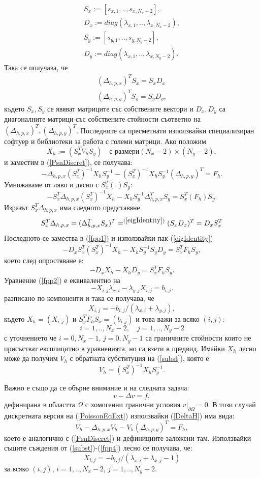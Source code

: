 \documentclass{article}
\newcommand{\be}{\begin{equation}}
\newcommand{\ee}{\end{equation}}
\newcommand{\rf}[1]{(\ref{#1})}
\theoremstyle{remark}
\begin{document}
\begin{align}
S_x:=[s_{x,1},..,s_{x,N_x-2}],\\
D_x:= diag(\lambda_{x,1},..,\lambda_{x,N_x-2}),\\
S_y:=[s_{y,1},..,s_{y,N_y-2}],\\
D_y:= diag(\lambda_{x,1},..,\lambda_{x,N_y-2}).
\end{align}
Така се получава, че
\begin{align}\label{eigIdentity}
(\Delta_{h,p,x})^T  S_x = S_x  D_x\nonumber\\
(\Delta_{h,p,y})^T   S_y = S_y  D_y,
\end{align}
където $S_x, S_y$ се явяват матриците със собствените вектори и $D_x, D_y$ са диагоналните матрици със собствените стойности съответно на $(\Delta_{h,p,x})^T, (\Delta_{h,p,y})^T$. Последните са пресметнати използвайки специализиран софтуер и библиотеки за работа с големи матрици. Ако положим
\be\label{subst}
X_h := ( S_x^T  V_h  S_y ) \quad \text{с размери} (N_x-2)\times(N_y-2),
\ee
и заместим в \rf{PsnDiscret}, се получава:
\be
-\Delta_{h,p,x}  (S_x^T)^{-1} X_h  S_y^{-1}  -(S_x^T)^{-1} X_h  S_y^{-1}  (\Delta_{h,p,y})^T = F_h.
\ee
Умножаваме от ляво и дясно с $ S_x^T  ( . )  S_y$:
\be\label{fpp1}
- S_x^T \Delta_{h,p,x} (S_x^T)^{-1} X_h -X_h  S_y^{-1}  \Delta_{h,p,x}^T  S_y = S_x^T  ( F_h )  S_y.
\ee
Изразът $S_x^T  \Delta_{h,p,x}$ има следното представяне
\be
S_x^T  \Delta_{h,p,x} = (\Delta_{h,p,x}^T  S_x)^T =^{\rf{eigIdentity}} (S_x  D_x)^T = D_x  S_x^T
\ee
Последното се замества в \rf{fpp1} и използвайки пак \rf{eigIdentity}
\be
- D_x  S_x^T (S_x^T)^{-1} X_h  -X_h  S_y^{-1}  S_y  D_y = S_x^T  F_h   S_y,
\ee
което след опростяване е:
\be\label{fpp2}
- D_x  X_h -X_h  D_y = S_x^T  F_h  S_y.
\ee
Уравнение \rf{fpp2} е еквивалентно на
\be\label{fpp3}
-X_{i,j} \lambda_{x,i} - \lambda_{y,j} X_{i,j} = b_{i,j}.
\ee
разписано по компоненти и така се получава, че
\be\label{fpp4}
X_{i,j} = - b_{i,j}/(\lambda_{x,i} + \lambda_{y,j} ),
\ee
където $X_h = (X_{i,j})$ и $S_y^T  F_h   S_x = (b_{i,j})$ и това важи за всяко $(i,j)$:
$$i = 1,..,N_x-2, \quad j = 1,..,N_y-2 $$
с уточнението че $i = 0,N_x-1$, $j = 0,N_y-1$ са граничните стойности които не присъстват експлицитно в уравненията, но са взети в предвид. Имайки $X_h$ лесно може да получим $V_h$  с обратната субституция на \rf{subst}, която е 
\be\label{substInv}
V_h = (S_x^T)^{-1}  X_h  S_y^{-1}.
\ee

Важно е също да се обърне внимание и на следната задача:
\be\label{PoissonEqExt}
v-\Delta v = f,
\ee
дефинирана в областта $\Omega$ с хомогенни гранични условия $v \big|_{\partial\Omega} = 0$. В този случай дискретната версия на \rf{PoissonEqExt} използвайки \rf{DeltaH} има вида:
\be\label{PsnDiscretExt}
V_h - \Delta_{h,p,x}  V_h - V_h  (\Delta_{h,p,y}) ^{T}  = F_h,
\ee
което е аналогично с \rf{PsnDiscret} и дефинициите заложени там. Използвайки същите съждения от \rf{subst}-\rf{fpp4} лесно се получава, че:
\be\label{fpp4Ext}
X_{i,j} = - b_{i,j}/(\lambda_{x,i}  + \lambda_{x,j} -1)
\ee
за всяко $(i,j)$, $i = 1,..,N_x-2$, $j = 1,..,N_y-2 $.
\end{document}
